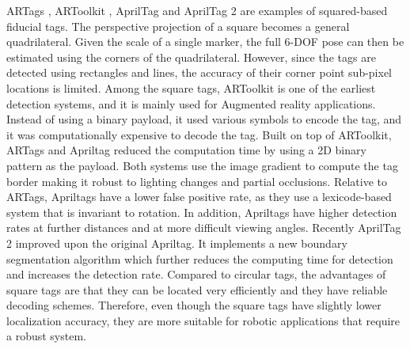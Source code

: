 	ARTags \citep{fiala2004artag}, ARToolkit \citep{kato2002artoolkit}, AprilTag \citep{olson2011apriltag} and AprilTag 2 \citep{wang2016apriltag} are examples of squared-based fiducial tags. The perspective projection of a square becomes a general quadrilateral. Given the scale of a single marker, the full 6-DOF pose can then be estimated using the corners of the quadrilateral. However, since the tags are detected using rectangles and lines, the accuracy of their corner point sub-pixel locations is limited. Among the square tags, ARToolkit is one of the earliest detection systems, and it is mainly used for Augmented reality applications. Instead of using a binary payload, it used various symbols to encode the tag, and it was computationally expensive to decode the tag. Built on top of ARToolkit, ARTags and Apriltag reduced the computation time by using a 2D binary pattern as the payload. Both systems use the image gradient to compute the tag border making it robust to lighting changes and partial occlusions. Relative to ARTags, Apriltags have a lower false positive rate, as they use a lexicode-based system that is invariant to rotation. In addition, Apriltags have higher detection rates at further distances and at more difficult viewing angles. Recently AprilTag 2 improved upon the original Apriltag. It implements a new boundary segmentation algorithm which further reduces the computing time for detection and increases the detection rate. Compared to circular tags, the advantages of square tags are that they can be located very efficiently and they have reliable decoding schemes. Therefore, even though the square tags have slightly lower localization accuracy, they are more suitable for robotic applications that require a robust system.
